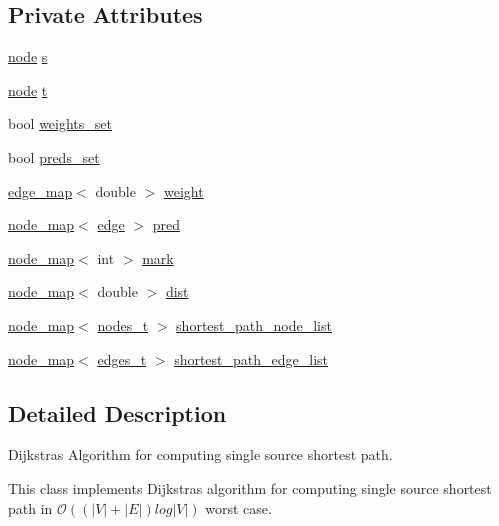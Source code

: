 \subsection*{Private Attributes}
\begin{DoxyCompactItemize}
\item 
\mbox{\hyperlink{classnode}{node}} \mbox{\hyperlink{classdijkstra_a721bfb648626a1be2b9d276d85ebdb9d}{s}}
\item 
\mbox{\hyperlink{classnode}{node}} \mbox{\hyperlink{classdijkstra_a6c42e614aabfbef25b5acfb543fbe1d1}{t}}
\item 
bool \mbox{\hyperlink{classdijkstra_ad60e0abd80def985afa753b7dadef771}{weights\+\_\+set}}
\item 
bool \mbox{\hyperlink{classdijkstra_aaba530e703b5d4005b3c01fa1a11182d}{preds\+\_\+set}}
\item 
\mbox{\hyperlink{classedge__map}{edge\+\_\+map}}$<$ double $>$ \mbox{\hyperlink{classdijkstra_ac077e6b471b7178d7aef78e54c6a07cf}{weight}}
\item 
\mbox{\hyperlink{classnode__map}{node\+\_\+map}}$<$ \mbox{\hyperlink{classedge}{edge}} $>$ \mbox{\hyperlink{classdijkstra_a662d982b45b2992ecf7b7f7e6696f9f9}{pred}}
\item 
\mbox{\hyperlink{classnode__map}{node\+\_\+map}}$<$ int $>$ \mbox{\hyperlink{classdijkstra_a407f98e26ca2cfb8c9ddecf4f8babdcc}{mark}}
\item 
\mbox{\hyperlink{classnode__map}{node\+\_\+map}}$<$ double $>$ \mbox{\hyperlink{classdijkstra_a154cafdd5511db8f61770348ef117cda}{dist}}
\item 
\mbox{\hyperlink{classnode__map}{node\+\_\+map}}$<$ \mbox{\hyperlink{edge_8h_a22ac17689106ba21a84e7bc54d1199d6}{nodes\+\_\+t}} $>$ \mbox{\hyperlink{classdijkstra_a67b45d0af528737830ea559ee42c4685}{shortest\+\_\+path\+\_\+node\+\_\+list}}
\item 
\mbox{\hyperlink{classnode__map}{node\+\_\+map}}$<$ \mbox{\hyperlink{edge_8h_a8f9587479bda6cf612c103494b3858e3}{edges\+\_\+t}} $>$ \mbox{\hyperlink{classdijkstra_a4c647f083ee4d12327e5c1ea3bf2e7c2}{shortest\+\_\+path\+\_\+edge\+\_\+list}}
\end{DoxyCompactItemize}


\subsection{Detailed Description}
Dijkstra\textquotesingle{}s Algorithm for computing single source shortest path. 

This class implements Dijkstra\textquotesingle{}s algorithm for computing single source shortest path in $\mathcal{O}((|V| + |E|) log |V|)$ worst case.

